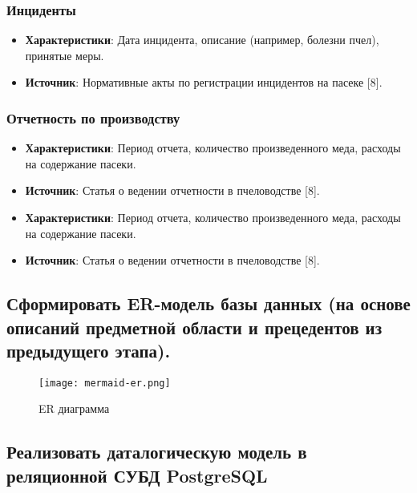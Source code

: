 \documentclass{article}
\begin{document}
\subsubsection{Инциденты}
\begin{itemize}
    \item \textbf{Характеристики}: Дата инцидента, описание (например, болезни пчел), принятые меры.
    \item \textbf{Источник}: Нормативные акты по регистрации инцидентов на пасеке [8].
\end{itemize}

\subsubsection{Отчетность по производству}
\begin{itemize}
    \item \textbf{Характеристики}: Период отчета, количество произведенного меда, расходы на содержание пасеки.
    \item \textbf{Источник}: Статья о ведении отчетности в пчеловодстве [8].
\end{itemize}

\begin{itemize}
    \item \textbf{Характеристики}: Период отчета, количество произведенного меда, расходы на содержание пасеки.
    \item \textbf{Источник}: Статья о ведении отчетности в пчеловодстве [8].
\end{itemize}

\subsection{Сформировать ER-модель базы данных (на основе описаний предметной области и прецедентов из предыдущего этапа).}

\begin{figure}[H]
    \centering
    \texttt{[image: mermaid-er.png]}
    \caption{ER диаграмма}
    \label{fig:enter-label}
\end{figure}

\subsection{Реализовать даталогическую модель в реляционной СУБД PostgreSQL}
\end{document}
